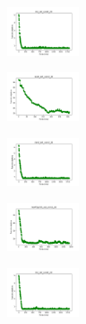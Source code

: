\begin{figure}[H]
    \centering
    \begin{subfigure}
        \centering
        \includegraphics[width=0.234\textwidth]{img/am10/iris_set_const_20_949004259_cost.png}
    \end{subfigure}
    \hfill
    \begin{subfigure}
        \centering
        \includegraphics[width=0.234\textwidth]{img/am10/ecoli_set_const_20_949004259_cost.png}
    \end{subfigure}
    \hfill
    \begin{subfigure}
        \centering
        \includegraphics[width=0.234\textwidth]{img/am10/rand_set_const_20_949004259_cost.png}
    \end{subfigure}
    \hfill
    \begin{subfigure}
        \centering
        \includegraphics[width=0.234\textwidth]{img/am10/newthyroid_set_const_20_949004259_cost.png}
    \end{subfigure}
    \hfill
    \begin{subfigure}
        \centering
        \includegraphics[width=0.234\textwidth]{img/am10/iris_set_const_20_589741062_cost.png}
    \end{subfigure}
    \hfill

\end{figure}
